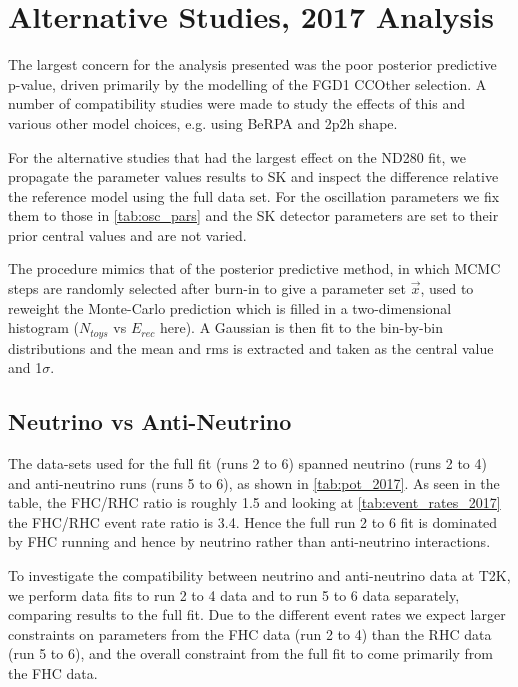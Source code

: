 \chapter{Alternative Studies, 2017 Analysis}
\label{sec:data_alt_studies}
The largest concern for the analysis presented was the poor posterior predictive p-value, driven primarily by the modelling of the FGD1 CCOther selection. A number of compatibility studies were made to study the effects of this and various other model choices, e.g. using BeRPA and 2p2h shape.

For the alternative studies that had the largest effect on the ND280 fit, we propagate the parameter values results to SK and inspect  the difference relative the reference model using the full data set. For the oscillation parameters we fix them to those in \autoref{tab:osc_pars} and the SK detector parameters are set to their prior central values and are not varied.

The procedure mimics that of the posterior predictive method, in which MCMC steps are randomly selected after burn-in to give a parameter set $\vec{x}$, used to reweight the Monte-Carlo prediction which is filled in a two-dimensional histogram ($N_{toys}$ vs $E_{rec}$ here). A Gaussian is then fit to the bin-by-bin distributions and the mean and rms is extracted and taken as the central value and 1$\sigma$.

\section{Neutrino vs Anti-Neutrino}
The data-sets used for the full fit (runs 2 to 6) spanned neutrino (runs 2 to 4) and anti-neutrino runs (runs 5 to 6), as shown in  \autoref{tab:pot_2017}. As seen in the table, the FHC/RHC ratio is roughly 1.5 and looking at \autoref{tab:event_rates_2017} the FHC/RHC event rate ratio is 3.4. Hence the full run 2 to 6 fit is dominated by FHC running and hence by neutrino rather than anti-neutrino interactions.

To investigate the compatibility between neutrino and anti-neutrino data at T2K, we perform data fits to run 2 to 4 data and to run 5 to 6 data separately, comparing results to the full fit. Due to the different event rates we expect larger constraints on parameters from the FHC data (run 2 to 4) than the RHC data (run 5 to 6), and the overall constraint from the full fit to come primarily from the FHC data. 

